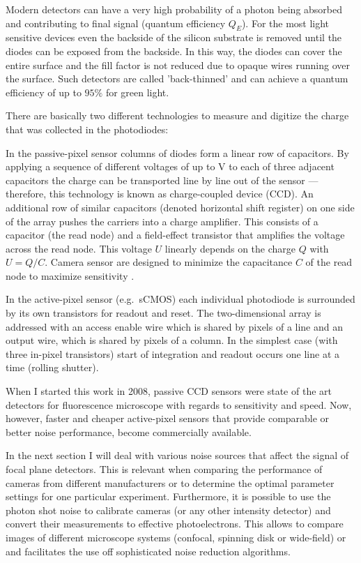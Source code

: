 Modern detectors can have a very high probability of a photon being
 absorbed and contributing to final signal
(quantum efficiency $Q_E$). For the most light sensitive devices even
the backside of the silicon substrate is removed until the diodes can
be exposed from the backside. In this way, the diodes can cover the
entire surface and the fill factor is not reduced due to opaque wires
running over the surface. Such detectors are called 'back-thinned' and
can achieve a quantum efficiency of up to $95\%$ for green light.

There are basically two different technologies to measure and digitize
the charge that was collected in the photodiodes:

In the passive-pixel sensor columns of diodes form a linear row of
 capacitors. By applying a sequence
of different voltages of up to \unit[6]{V} to each of three adjacent
capacitors the charge can be transported line by line out of the
sensor --- therefore, this technology is known as charge-coupled
device (CCD). An additional row of similar capacitors (denoted
horizontal shift register) on one side of the array pushes the
carriers into a charge amplifier.  This consists
of a capacitor (the read node) and a field-effect transistor that
amplifies the voltage across the read node. This voltage $U$ linearly
depends on the charge $Q$ with $U=Q/C$. Camera sensor are designed to
minimize the capacitance $C$ of the read node to maximize sensitivity
\citep{Pawley2006}. 

In the active-pixel sensor (e.g.\ sCMOS) each individual photodiode is surrounded by
its own  transistors for readout and
reset. The two-dimensional array is addressed with an access
enable wire which is shared by pixels of a line and an output wire,
which is shared by pixels of a column. In the simplest case (with
three in-pixel transistors) start of integration and readout occurs
one line at a time (rolling shutter).

When I started this work in 2008, passive CCD sensors were state of
the art detectors for fluorescence microscope with regards to
sensitivity and speed. Now, however, faster and cheaper active-pixel
sensors that provide comparable or better noise performance, become
commercially available.

In the next section I will deal with various noise sources that affect
the signal of focal plane detectors. This is relevant when comparing
the performance of cameras from different manufacturers or to
determine the optimal parameter settings for one particular
experiment. Furthermore, it is possible to use the photon shot noise
to calibrate cameras (or any other intensity detector) and convert
their measurements to effective photoelectrons.  This allows to compare
images of different microscope systems (confocal, spinning disk or
wide-field) or and facilitates the use off sophisticated noise
reduction algorithms.

